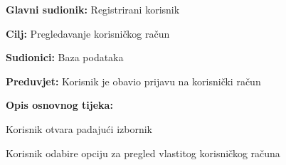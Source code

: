 \noindent {}
\begin{packed_item}

	\item \textbf{Glavni sudionik: }Registrirani korisnik
	\item  \textbf{Cilj:} Pregledavanje korisničkog račun
	\item  \textbf{Sudionici:} Baza podataka
	\item  \textbf{Preduvjet:} Korisnik je obavio prijavu na korisnički račun
	\item  \textbf{Opis osnovnog tijeka:}

	\item[] \begin{packed_enum}

		\item Korisnik otvara padajući izbornik
		\item Korisnik odabire opciju za pregled vlastitog korisničkog računa
	\end{packed_enum}
\end{packed_item}


